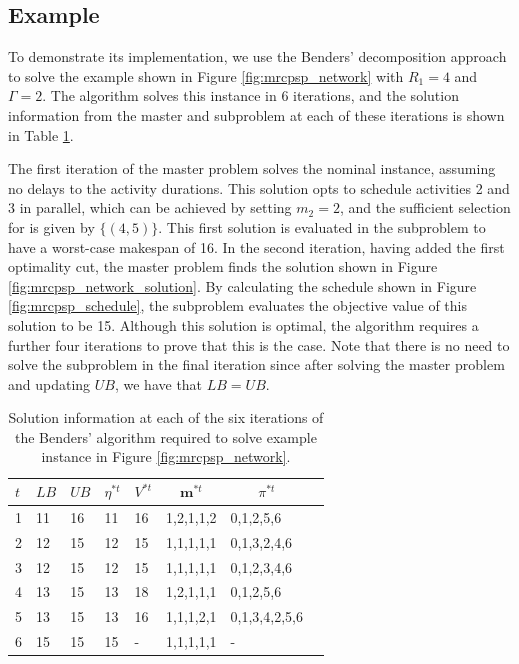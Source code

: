 \documentclass[a4paper,abstracton]{scrartcl}
\begin{document}
\subsection{Example}

To demonstrate its implementation, we use the Benders' decomposition approach to solve the example shown in Figure \ref{fig:mrcpsp_network} with $R_1=4$ and $\Gamma=2$. The algorithm solves this instance in 6 iterations, and the solution information from the master and subproblem at each of these iterations is shown in Table \ref{table:benders_example}.

The first iteration of the master problem solves the nominal instance, assuming no delays to the activity durations. This solution opts to schedule activities 2 and 3 in parallel, which can be achieved by setting $m_2=2$, and the sufficient selection for is given by $\{(4,5)\}$. This first solution is evaluated in the subproblem to have a worst-case makespan of 16. In the second iteration, having added the first optimality cut, the master problem finds the solution shown in Figure \ref{fig:mrcpsp_network_solution}. By calculating the schedule shown in Figure \ref{fig:mrcpsp_schedule}, the subproblem evaluates the objective value of this solution to be 15. Although this solution is optimal, the algorithm requires a further four iterations to prove that this is the case. Note that there is no need to solve the subproblem in the final iteration since after solving the master problem and updating $UB$, we have that $LB=UB$.
\begin{table}[h]
\centering
{\renewcommand{\arraystretch}{1.2}  %
\begin{tabular}{llllllll}
	\hline \hline
	$t$ & $LB$ & $UB$ & $\eta^{*t}$ & $V^{*t}$ & \multicolumn{1}{c}{$\bm{m}^{*t}$}     & \multicolumn{1}{c}{$\pi^{*t}$}  \\
	\hline
1         & 11 & 16 & 11          & 16                                  & 1,2,1,1,2 & 0,1,2,5,6 \\
2         & 12 & 15 & 12          & 15                                  & 1,1,1,1,1 & 0,1,3,2,4,6 \\
3         & 12 & 15 & 12          & 15                                  & 1,1,1,1,1 & 0,1,2,3,4,6 \\
4         & 13 & 15 & 13          & 18                                  & 1,2,1,1,1 & 0,1,2,5,6 \\
5         & 13 & 15 & 13          & 16                                  & 1,1,1,2,1 & 0,1,3,4,2,5,6 \\
6         & 15 & 15 & 15          & -                                   & 1,1,1,1,1 & - \\
	\hline \hline
\end{tabular}
\caption{Solution information at each of the six iterations of the Benders' algorithm required to solve example instance in Figure \ref{fig:mrcpsp_network}.}
\label{table:benders_example}}
\end{table}
\end{document}
